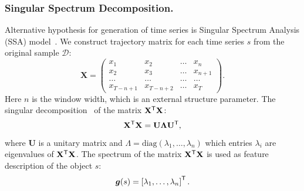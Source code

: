 \documentclass{llncs}
\newcommand{\T}{{\mbox{\scriptsize\sffamily\upshape\mdseries T}}}
\begin{document}
\subsubsection{Singular Spectrum Decomposition.}
Alternative hypothesis for generation of time series is Singular Spectrum Analysis (SSA) model~\cite{hassani2007singular}. We construct trajectory matrix for each time series $s$ from the original sample $\mathcal{D}$:
\[
\mathbf{X} = 
\begin{pmatrix}
x_1 & x_2 & \dots & x_n \\
x_2 & x_3 & \dots & x_{n+1} \\
\dots & \dots & \dots & \dots \\
x_{T-n+1} & x_{T-n+2} & \dots & x_T
\end{pmatrix}.
\]
Here $n$ is the window width, which is an external structure parameter.
The singular decomposition~\cite{golub1970singular} of the matrix $\mathbf{X}^{\T} \mathbf{X}$:
\[
\mathbf{X}^{\T} \mathbf{X} = \mathbf{U} \mathbf{\Lambda} \mathbf{U}^{\T},
\]
where $\mathbf{U}$ is a unitary matrix and $\Lambda = \mathrm{diag}(\lambda_1, \dots, \lambda_n)$ which entries $\lambda_i$ are eigenvalues of $\mathbf{X}^{\T} \mathbf{X}$. 
The spectrum of the matrix $\mathbf{X}^{\T} \mathbf{X}$ is used as feature description of the object $s$:
\[
\bm{g}(s) = \left[\lambda_1, \dots, \lambda_n\right]^{\T}.
\]
\end{document}
